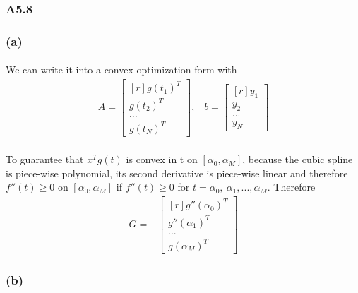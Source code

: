 \subsubsection*{A5.8}
\subsubsection*{(a)}
\paragraph{}
We can write it into a convex optimization form with
\begin{align*}
A=\begin{bmatrix*}[r]
g(t_1)^T\\ 
g(t_2)^T\\
... \ \ \\
g(t_N)^T
\end{bmatrix*}
\text{,} \quad 
b=\begin{bmatrix*}[r]
y_1\\ 
y_2\\
... \\
y_N
\end{bmatrix*}
\end{align*}
\paragraph{}
To guarantee that $x^Tg(t)$ is convex in t on $[\alpha_0,\alpha_M]$, because the cubic spline is piece-wise polynomial, its second derivative is piece-wise linear and therefore $f''(t) \geq 0$ on $[\alpha_0,\alpha_M]$ if $f''(t) \geq 0$ for $t=\alpha_0,\ \alpha_1,...,\alpha_M $. Therefore
\begin{align*}
G=-\begin{bmatrix*}[r]
g''(\alpha_0)^T\\ 
g''(\alpha_1)^T\\
... \ \ \\
g(\alpha_M)^T
\end{bmatrix*}
\end{align*}
\subsubsection*{(b)}
